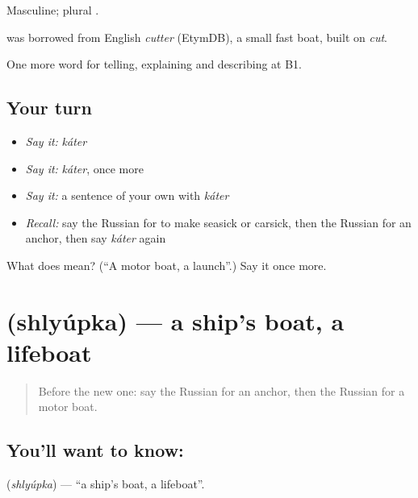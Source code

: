 Masculine; plural \emph{}.

\begin{cousinweb}
\emph{} was borrowed from English \emph{cutter} (EtymDB), a small fast boat, built on \emph{cut}.
\end{cousinweb}

\begin{grammarlens}[title={What you've built}]
One more word for telling, explaining and describing at B1.
\end{grammarlens}

\subsection*{Your turn}
\begin{itemize}
\raggedright
  \item \emph{Say it:} \emph{káter}
  \item \emph{Say it:} \emph{káter}, once more
  \item \emph{Say it:} a sentence of your own with \emph{káter}
  \item \emph{Recall:} say the Russian for to make seasick or carsick, then the Russian for an anchor, then say \emph{káter} again
\end{itemize}

\begin{tcolorbox}[breakable,colback=teal!4,colframe=teal!35!black,title={Before you move on}]
What does  mean? (\textquotedblleft{}A motor boat, a launch\textquotedblright{}.) Say it once more.
\end{tcolorbox}
\section[\texorpdfstring{\ru{шлюпка} (shlyúpka)}{шлюпка (shlyúpka)}]{ (shlyúpka) — a ship's boat, a lifeboat}

\label{lesson:RU-C426-shlyupka}



\begin{quote}
Before the new one: say the Russian for an anchor, then the Russian for a motor boat.
\end{quote}

\subsection*{You'll want to know: }
\textbf{} (\emph{shlyúpka}) — \textquotedblleft{}a ship's boat, a lifeboat\textquotedblright{}.


